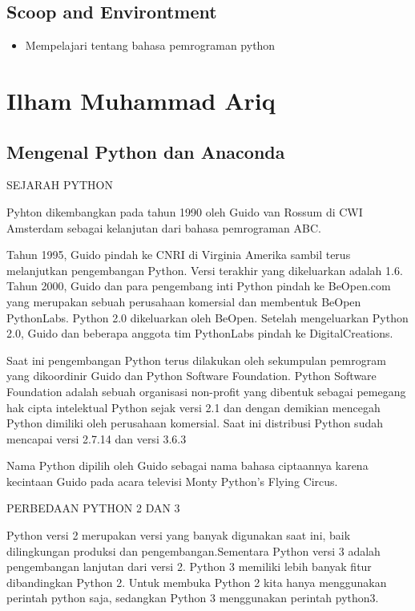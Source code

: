 \subsection{Scoop and Environtment}
\begin{itemize}
\item Mempelajari tentang bahasa pemrograman python
\end{itemize}


\section{Ilham Muhammad Ariq}
\subsection{Mengenal Python dan Anaconda}
\begin{enumerate}
    \item 
{SEJARAH PYTHON}
\par
{Pyhton dikembangkan pada tahun 1990 oleh Guido van Rossum di CWI Amsterdam sebagai kelanjutan dari bahasa pemrograman ABC.}
\par
{Tahun 1995, Guido pindah ke CNRI di Virginia Amerika sambil terus melanjutkan pengembangan Python. Versi terakhir yang dikeluarkan adalah 1.6. Tahun 2000, Guido dan para pengembang inti Python pindah ke BeOpen.com yang merupakan sebuah perusahaan komersial dan membentuk BeOpen PythonLabs. Python 2.0 dikeluarkan oleh BeOpen. Setelah mengeluarkan Python 2.0, Guido dan beberapa anggota tim PythonLabs pindah ke DigitalCreations.
\par
Saat ini pengembangan Python terus dilakukan oleh sekumpulan pemrogram yang dikoordinir Guido dan Python Software Foundation. Python Software Foundation adalah sebuah organisasi non-profit yang dibentuk sebagai pemegang hak cipta intelektual Python sejak versi 2.1 dan dengan demikian mencegah Python dimiliki oleh perusahaan komersial. Saat ini distribusi Python sudah mencapai versi 2.7.14 dan versi 3.6.3
\par
Nama Python dipilih oleh Guido sebagai nama bahasa ciptaannya karena kecintaan Guido pada acara televisi Monty Python's Flying Circus. 
    \item
PERBEDAAN PYTHON 2 DAN 3
\par
Python versi 2 merupakan versi yang banyak digunakan saat ini, baik dilingkungan produksi dan pengembangan.Sementara Python versi 3 adalah pengembangan lanjutan dari versi 2. Python 3 memiliki lebih banyak fitur dibandingkan Python 2. Untuk membuka Python 2 kita hanya menggunakan perintah python saja, sedangkan Python 3 menggunakan perintah python3.
 }   
\end{enumerate}


